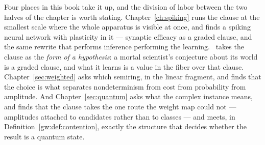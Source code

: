 Four places in this book take it up, and the division of labor between the two halves of
the chapter is worth stating. Chapter~\ref{ch:spiking} runs the clause at the smallest
scale where the whole apparatus is visible at once, and finds a spiking neural network
with plasticity in it --- synaptic efficacy as a graded clause, and the same rewrite that
performs inference performing the learning. \chSci\ takes the clause as the \emph{form of
a hypothesis}: a mortal scientist's conjecture about its world is a graded clause, and
what it learns is a value in the fiber over that clause. Chapter~\ref{sec:weighted} asks
which semiring, in the linear fragment, and finds that the choice is what separates
nondeterminism from cost from probability from amplitude. And Chapter~\ref{sec:quantum}
asks what the complex instance means, and finds that the clause takes the one route the
weight map could not --- amplitudes attached to candidates rather than to classes ---
and meets, in Definition~\ref{gw:def:contention}, exactly the structure that decides
whether the result is a quantum state.

